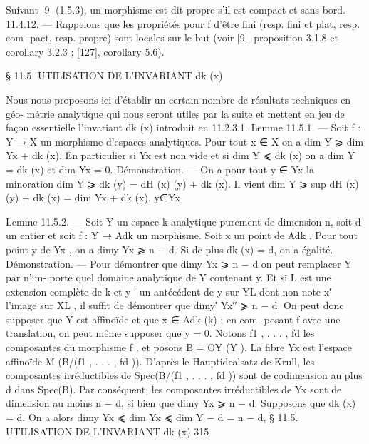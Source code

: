 \documentclass[
  10pt,
]{article}
\newenvironment{Shaded}{}{}
\newcommand{\NormalTok}[1]{#1}
\begin{document}
\begin{Shaded}
\begin{Highlighting}[]
\NormalTok{  Suivant [9] (1.5.3), un morphisme est dit propre s’il est compact et sans bord.}
\NormalTok{11.4.12. — Rappelons que les propriétés pour f d’être fini (resp. fini et plat, resp. com{-}}
\NormalTok{pact, resp. propre) sont locales sur le but (voir [9], proposition 3.1.8 et corollary 3.2.3 ;}
\NormalTok{[127], corollary 5.6).}



\NormalTok{                § 11.5. UTILISATION DE L’INVARIANT dk (x)}

\NormalTok{   Nous nous proposons ici d’établir un certain nombre de résultats techniques en géo{-}}
\NormalTok{métrie analytique qui nous seront utiles par la suite et mettent en jeu de façon essentielle}
\NormalTok{l’invariant dk (x) introduit en 11.2.3.1.}
\NormalTok{Lemme 11.5.1. — Soit f : Y → X un morphisme d’espaces analytiques. Pour tout}
\NormalTok{x ∈ X on a}
\NormalTok{                                dim Y ⩾ dim Yx + dk (x).}
\NormalTok{En particulier si Yx est non vide et si dim Y ⩽ dk (x) on a dim Y = dk (x) et dim Yx = 0.}
\NormalTok{Démonstration. — On a pour tout y ∈ Yx la minoration}
\NormalTok{                            dim Y ⩾ dk (y) = dH (x) (y) + dk (x).}
\NormalTok{Il vient}
\NormalTok{                    dim Y ⩾ sup dH (x) (y) + dk (x) = dim Yx + dk (x).}
\NormalTok{                              y∈Yx}




\NormalTok{Lemme 11.5.2. — Soit Y un espace k{-}analytique purement de dimension n, soit d un}
\NormalTok{entier et soit f : Y → Adk un morphisme. Soit x un point de Adk . Pour tout point y de Yx ,}
\NormalTok{on a dimy Yx ⩾ n − d. Si de plus dk (x) = d, on a égalité.}
\NormalTok{Démonstration. — Pour démontrer que dimy Yx ⩾ n − d on peut remplacer Y par n’im{-}}
\NormalTok{porte quel domaine analytique de Y contenant y. Et si L est une extension complète de k}
\NormalTok{et y ′ un antécédent de y sur YL dont non note x′ l’image sur XL , il suffit de démontrer que}
\NormalTok{dimy′ Yx′′ ⩾ n − d. On peut donc supposer que Y est affinoïde et que x ∈ Adk (k) ; en com{-}}
\NormalTok{posant f avec une translation, on peut même supposer que y = 0. Notons f1 , . . . , fd les}
\NormalTok{composantes du morphisme f , et posons B = OY (Y ). La fibre Yx est l’espace affinoïde}
\NormalTok{M (B/(f1 , . . . , fd )). D’après le Hauptidealsatz de Krull, les composantes irréductibles}
\NormalTok{de Spec(B/(f1 , . . . , fd )) sont de codimension au plus d dans Spec(B). Par conséquent,}
\NormalTok{les composantes irréductibles de Yx sont de dimension au moins n − d, si bien que}
\NormalTok{dimy Yx ⩾ n − d.}
\NormalTok{   Supposons que dk (x) = d. On a alors}
\NormalTok{                         dimy Yx ⩽ dim Yx ⩽ dim Y − d = n − d,}
\NormalTok{                            § 11.5. UTILISATION DE L’INVARIANT dk (x)                              315}


\end{Highlighting}
\end{Shaded}
\end{document}
